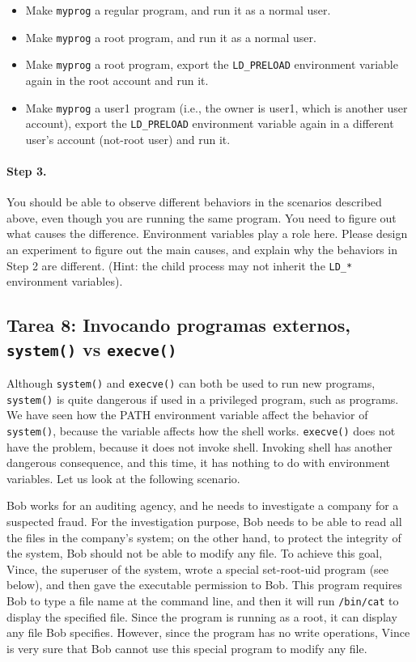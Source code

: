   \begin{itemize}
  \item Make {\tt myprog} a regular program, and run it as a normal user.
  \item Make {\tt myprog} a \setuid root program, and run it as a normal user.
  \item Make {\tt myprog} a \setuid root program, export the {\tt LD\_PRELOAD}
  environment variable again in the root account and run it.

  \item Make {\tt myprog} a \setuid user1 program (i.e., the owner is user1, which
        is another user account), export the {\tt LD\_PRELOAD} environment variable
	again in a different user's account (not-root user) and run it.
  \end{itemize}


\paragraph{Step 3.}
You should be able to observe different behaviors in the scenarios
described above, even though you are running the same program.  You need
to figure out what causes the difference. Environment variables
play a role here. Please design an experiment to figure out the
main causes, and explain why the behaviors in Step 2 are
different. (Hint: the child process
may not inherit the {\tt LD\_*} environment variables).



\subsection{Tarea 8: Invocando programas externos, {\tt system()} vs {\tt execve()}}

Although {\tt system()} and {\tt execve()} can both be used to run new
programs, {\tt system()} is quite dangerous if used in a privileged
program, such as \setuid programs. We have seen how the PATH environment
variable affect the behavior of {\tt system()}, because the variable
affects how the shell works. {\tt execve()} does not have the problem,
because it does not invoke shell. Invoking shell has another dangerous
consequence, and this time, it has nothing to do with environment
variables.  Let us look at the following scenario.


Bob works for an auditing agency, and he needs to investigate a company for a suspected
fraud. For the investigation purpose, Bob needs to be able to read
all the files in the
company's \unix system; on the other hand, to protect the integrity of the system,
Bob should not be able to modify any file.
To achieve this goal, Vince, the superuser of the system,
wrote a special set-root-uid program (see
below), and then gave the executable permission to Bob. This program requires
Bob to type a file name at the command line, and then it will
run {\tt /bin/cat} to display the specified file. Since the program is running
as a root, it can display any file Bob specifies. However, since the program
has no write operations, Vince is very sure that Bob cannot use this special program
to modify any file.

